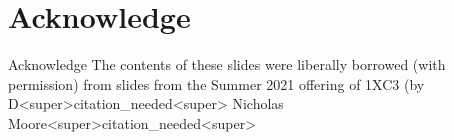 \documentclass[11pt]{beamer}
\begin{document}


\section[Acknowledge]{Acknowledge}
\begin{frame}{Acknowledge}
\center
\vspace{8em}
The contents of these slides were liberally borrowed (with permission) from slides from the Summer 2021 offering of 1XC3 (by D<super>citation_needed<super> Nicholas Moore<super>citation_needed<super>  
\end{frame}
\end{document}
